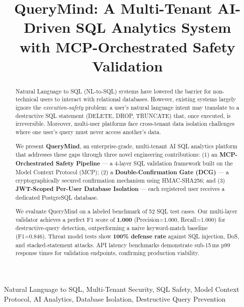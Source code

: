 \documentclass[conference]{IEEEtran}
\begin{document}
\title{QueryMind: A Multi-Tenant AI-Driven SQL Analytics System\\
with MCP-Orchestrated Safety Validation}

\author{
}

\maketitle

\begin{abstract}
Natural Language to SQL (NL-to-SQL) systems have lowered the barrier for non-technical users to interact with relational databases. However, existing systems largely ignore the \emph{execution-safety} problem: a user's natural language intent may translate to a destructive SQL statement (DELETE, DROP, TRUNCATE) that, once executed, is irreversible. Moreover, multi-user platforms face cross-tenant data isolation challenges where one user's query must never access another's data.

We present \textbf{QueryMind}, an enterprise-grade, multi-tenant AI SQL analytics platform that addresses these gaps through three novel engineering contributions: (1) an \textbf{MCP-Orchestrated Safety Pipeline} --- a 4-layer SQL validation framework built on the Model Context Protocol (MCP); (2) a \textbf{Double-Confirmation Gate (DCG)} --- a cryptographically secured confirmation mechanism using HMAC-SHA256; and (3) \textbf{JWT-Scoped Per-User Database Isolation} --- each registered user receives a dedicated PostgreSQL database.

We evaluate QueryMind on a labeled benchmark of 52 SQL test cases. Our multi-layer validator achieves a perfect F1 score of \textbf{1.000} (Precision=1.000, Recall=1.000) for destructive-query detection, outperforming a naive keyword-match baseline (F1=0.846). Threat model tests show \textbf{100\% defense rate} against SQL injection, DoS, and stacked-statement attacks. API latency benchmarks demonstrate sub-15\,ms p99 response times for validation endpoints, confirming production viability.
\end{abstract}

\begin{IEEEkeywords}
Natural Language to SQL, Multi-Tenant Security, SQL Safety, Model Context Protocol, AI Analytics, Database Isolation, Destructive Query Prevention
\end{IEEEkeywords}
\end{document}
